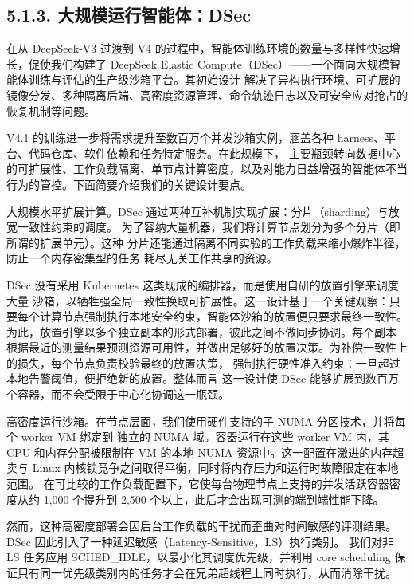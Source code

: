 \subsection{5.1.3. 大规模运行智能体：DSec}\label{running-agents-at-massive-scale-dsec}

在从 DeepSeek-V3 过渡到 V4 的过程中，智能体训练环境的数量与多样性快速增长，促使我们构建了 DeepSeek Elastic Compute（DSec）——一个面向大规模智能体训练与评估的生产级沙箱平台。其初始设计
解决了异构执行环境、可扩展的镜像分发、多种隔离后端、高密度资源管理、命令轨迹日志以及可安全应对抢占的恢复机制等问题。

V4.1 的训练进一步将需求提升至数百万个并发沙箱实例，涵盖各种
harness、平台、代码仓库、软件依赖和任务特定服务。在此规模下，
主要瓶颈转向数据中心的可扩展性、工作负载隔离、单节点计算密度，以及对能力日益增强的智能体不当行为的管控。下面简要介绍我们的关键设计要点。





大规模水平扩展计算。DSec 通过两种互补机制实现扩展：分片（sharding）与放宽一致性约束的调度。
为了容纳大量机器，我们将计算节点划分为多个分片（即所谓的扩展单元）。这种
分片还能通过隔离不同实验的工作负载来缩小爆炸半径，防止一个内存密集型的任务
耗尽无关工作共享的资源。

DSec 没有采用 Kubernetes 这类现成的编排器，而是使用自研的放置引擎来调度大量
沙箱，以牺牲强全局一致性换取可扩展性。这一设计基于一个关键观察：只要每个计算节点强制执行本地安全约束，智能体沙箱的放置便只要求最终一致性。
为此，放置引擎以多个独立副本的形式部署，彼此之间不做同步协调。每个副本
根据最近的测量结果预测资源可用性，并做出足够好的放置决策。为补偿一致性上的损失，每个节点负责校验最终的放置决策，
强制执行硬性准入约束：一旦超过本地告警阈值，便拒绝新的放置。整体而言
这一设计使 DSec 能够扩展到数百万个容器，而不会受限于中心化协调这一瓶颈。

高密度运行沙箱。在节点层面，我们使用硬件支持的子 NUMA 分区技术，并将每个 worker VM 绑定到
独立的 NUMA 域。容器运行在这些 worker VM 内，其 CPU 和内存分配被限制在 VM 的本地 NUMA
资源中。这一配置在激进的内存超卖与 Linux 内核锁竞争之间取得平衡，同时将内存压力和运行时故障限定在本地范围。
在可比较的工作负载配置下，它使每台物理节点上支持的并发活跃容器密度从约 1,000 个提升到 2,500 个以上，此后才会出现可测的端到端性能下降。

然而，这种高密度部署会因后台工作负载的干扰而歪曲对时间敏感的评测结果。DSec 因此引入了一种延迟敏感（Latency-Sensitive，LS）执行类别。
我们对非 LS 任务应用 SCHED\_IDLE，以最小化其调度优先级，并利用 core scheduling 保证只有同一优先级类别内的任务才会在兄弟超线程上同时执行，从而消除干扰。



